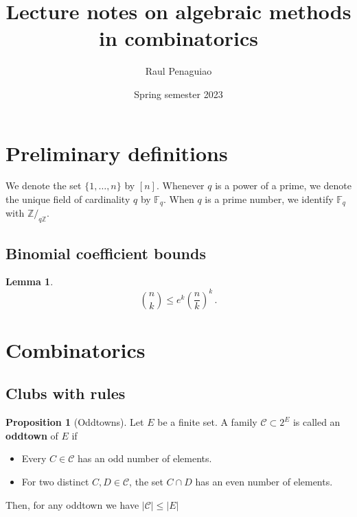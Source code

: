 \documentclass[12pt]{amsart}
\theoremstyle{definition}
\newtheorem{prop}[thm]{Proposition}
\newtheorem{lm}[thm]{Lemma}
\newcommand{\Z}{\mathbb{Z}}
\newcommand{\F}{\mathbb{F}}
\newcommand{\CC}{\mathcal C}
\begin{document}
\title{Lecture notes on algebraic methods in combinatorics} %

\author{Raul Penaguiao}
\address{Max Planck Institute for the Sciences Leipzig}
\subjclass[2010]{}
\date{Spring semester 2023} %


\maketitle


\section{Preliminary definitions}

We denote the set $\{1, \dots, n\}$ by $[n]$.
Whenever $q$ is a power of a prime, we denote the unique field of cardinality $q$ by $\F_q$.
When $q$ is a prime number, we identify $\F_q$ with $\Z/_{q\Z}$.

\subsection{Binomial coefficient bounds}


\begin{lm}\label{lm:binom_bound}
$$\binom{n}{k} \leq e^k \left( \frac{n}{k} \right)^k \, . $$
\end{lm}

\section{Combinatorics}

\subsection{Clubs with rules}


\begin{prop}[Oddtowns]\label{prop:oddtown}
Let $E$ be a finite set.
A family $\CC \subset 2^E $ is called an \textbf{oddtown} of $E$ if
\begin{itemize}
\item Every $C \in \CC $ has an odd number of elements.

\item For two distinct $C, D \in \CC$, the set $C\cap D$ has an even number of elements.
\end{itemize}

Then, for any oddtown we have $|\CC| \leq |E|$
\end{prop}
\end{document}
